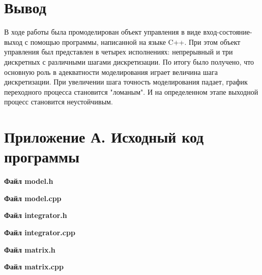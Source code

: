 \documentclass[14pt,a4paper]{extreport}
\begin{document}
\chapter*{Вывод}

В ходе работы была промоделирован объект управления в виде вход-состояние-выход 
с помощью программы, написанной на языке C++. При этом объект управления
был представлен в четырех исполнениях: непрерывный и три дискретных с 
различными шагами дискретизации. По итогу было получено, что основную
роль в адекватности моделирования играет величина шага дискретизации.
При увеличении шага точность моделирования падает, график переходного
процесса становится "ломаным". И на определенном этапе выходной процесс
становится неустойчивым.


\newpage
\chapter*{Приложение А. Исходный код программы}

\textbf{Файл model.h}
\begin{alltt}
    
\end{alltt}

\textbf{Файл model.cpp}
\begin{alltt}
    
\end{alltt}

\textbf{Файл integrator.h}
\begin{alltt}
    
\end{alltt}

\textbf{Файл integrator.cpp}
\begin{alltt}
    
\end{alltt}

\textbf{Файл matrix.h}
\begin{alltt}
    
\end{alltt}

\textbf{Файл matrix.cpp}
\begin{alltt}
    
\end{alltt}
\end{document}
